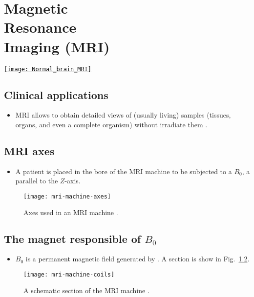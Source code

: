 \chapter[\glsentrylong{MRI} (\glsentryshort{MRI})]{Magnetic\\Resonance\\Imaging (MRI)}
\vspace{-50ex}
\begin{flushright}
\href{https://www.sciencephoto.com/media/728494/view/normal-brain-mri}{\texttt{[image: Normal\_brain\_MRI]}}
\end{flushright}

\section{Clinical applications}
\begin{itemize}
\item \gls{MRI}
  \cite{westbrook2018mri,Wu2022MRI_Physics,thePIRL2018NMR_basics,thePIRL2018SpinEcho,thePIRL2018Fourier,thePIRL2018GRE}
  allows to obtain detailed views of (usually living) samples
  (tissues, organs, and even a complete organism) without irradiate
  them \cite{wikipedia_MRI}.
\end{itemize}

\section{MRI axes}
\begin{itemize}
\item A patient is placed in the bore of the MRI machine to be
  subjected to a $B_0$, a  parallel to the $Z$-axis.
\end{itemize}
\vspace{-4ex}
\begin{figure}[!b]
  \centering
  \texttt{[image: mri-machine-axes]}
  \caption{Axes used in an MRI machine \cite{abdulla2025MRI_machine}.}
  \label{fig:MRI_axes}
\end{figure}

\section{The magnet responsible of $B_0$}
\begin{itemize}
\item $B_0$ is a permanent magnetic field generated by . A section is
  show in Fig.~\ref{fig:MRI_machine_scheme}.
\end{itemize}
\vspace{-4ex}
\begin{figure}[!b]
  \centering
  \texttt{[image: mri-machine-coils]}
  \caption{A schematic section of the MRI machine \cite{abdulla2025MRI_machine}.}
  \label{fig:MRI_machine_scheme}
\end{figure}

